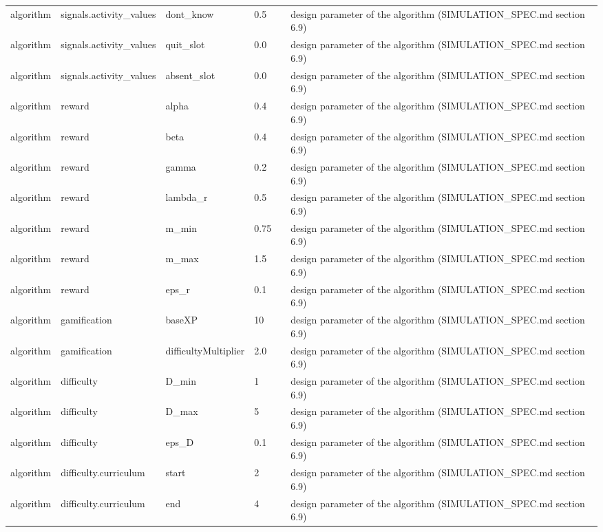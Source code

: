 \begin{table}[H]
\begin{tabular}{llllll}
algorithm & signals.activity\_values & dont\_know & 0.5 &  & design parameter of the algorithm (SIMULATION\_SPEC.md section 6.9) \\
algorithm & signals.activity\_values & quit\_slot & 0.0 &  & design parameter of the algorithm (SIMULATION\_SPEC.md section 6.9) \\
algorithm & signals.activity\_values & absent\_slot & 0.0 &  & design parameter of the algorithm (SIMULATION\_SPEC.md section 6.9) \\
algorithm & reward & alpha & 0.4 &  & design parameter of the algorithm (SIMULATION\_SPEC.md section 6.9) \\
algorithm & reward & beta & 0.4 &  & design parameter of the algorithm (SIMULATION\_SPEC.md section 6.9) \\
algorithm & reward & gamma & 0.2 &  & design parameter of the algorithm (SIMULATION\_SPEC.md section 6.9) \\
algorithm & reward & lambda\_r & 0.5 &  & design parameter of the algorithm (SIMULATION\_SPEC.md section 6.9) \\
algorithm & reward & m\_min & 0.75 &  & design parameter of the algorithm (SIMULATION\_SPEC.md section 6.9) \\
algorithm & reward & m\_max & 1.5 &  & design parameter of the algorithm (SIMULATION\_SPEC.md section 6.9) \\
algorithm & reward & eps\_r & 0.1 &  & design parameter of the algorithm (SIMULATION\_SPEC.md section 6.9) \\
algorithm & gamification & baseXP & 10 &  & design parameter of the algorithm (SIMULATION\_SPEC.md section 6.9) \\
algorithm & gamification & difficultyMultiplier & 2.0 &  & design parameter of the algorithm (SIMULATION\_SPEC.md section 6.9) \\
algorithm & difficulty & D\_min & 1 &  & design parameter of the algorithm (SIMULATION\_SPEC.md section 6.9) \\
algorithm & difficulty & D\_max & 5 &  & design parameter of the algorithm (SIMULATION\_SPEC.md section 6.9) \\
algorithm & difficulty & eps\_D & 0.1 &  & design parameter of the algorithm (SIMULATION\_SPEC.md section 6.9) \\
algorithm & difficulty.curriculum & start & 2 &  & design parameter of the algorithm (SIMULATION\_SPEC.md section 6.9) \\
algorithm & difficulty.curriculum & end & 4 &  & design parameter of the algorithm (SIMULATION\_SPEC.md section 6.9) \\

\end{tabular}
\end{table}
